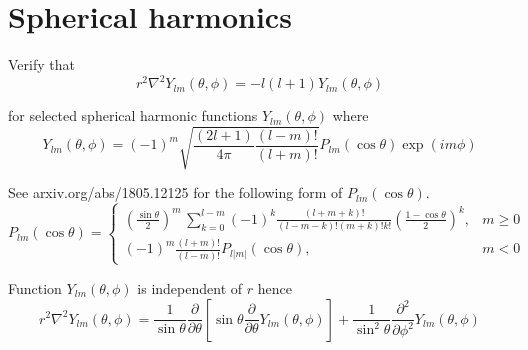 

\section*{Spherical harmonics}

Verify that
\begin{equation*}
r^2\nabla^2Y_{lm}(\theta,\phi)=-l(l+1)Y_{lm}(\theta,\phi)
\tag{1}
\end{equation*}

for selected spherical harmonic functions $Y_{lm}(\theta,\phi)$ where
\begin{equation*}
Y_{lm}(\theta,\phi)=(-1)^m\sqrt{\frac{(2l+1)}{4\pi}\frac{(l-m)!}{(l+m)!}}
P_{lm}(\cos\theta)\exp(im\phi)
\end{equation*}

See arxiv.org/abs/1805.12125 for the following form of $P_{lm}(\cos\theta)$.
\begin{equation*}
P_{lm}(\cos\theta)=\begin{cases}\displaystyle
\left(\frac{\sin\theta}{2}\right)^m\,\sum_{k=0}^{l-m}
(-1)^k\frac{(l+m+k)!}{(l-m-k)!(m+k)!k!}
\left(\frac{1-\cos\theta}{2}\right)^k, & m\ge0
\\[4ex]
\displaystyle(-1)^m\frac{(l+m)!}{(l-m)!}P_{l|m|}(\cos\theta), & m<0
\end{cases}
\end{equation*}

Function $Y_{lm}(\theta,\phi)$ is independent of $r$ hence
\begin{equation*}
r^2\nabla^2Y_{lm}(\theta,\phi)=\frac{1}{\sin\theta}\frac{\partial}{\partial\theta}
\left[\sin\theta\frac{\partial}{\partial\theta}Y_{lm}(\theta,\phi)\right]
+\frac{1}{\sin^2\theta}\frac{\partial^2}{\partial\phi^2}Y_{lm}(\theta,\phi)
\end{equation*}


